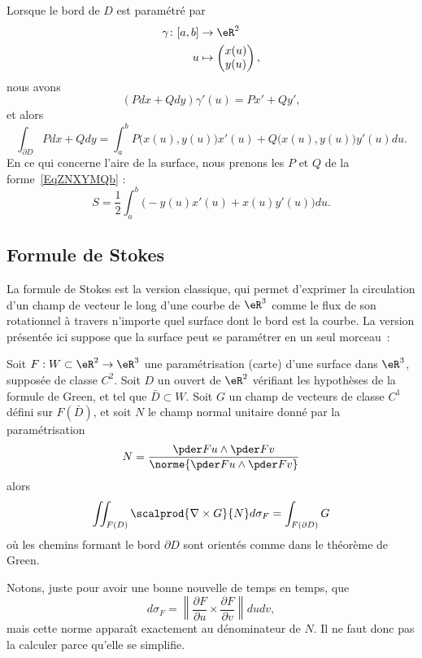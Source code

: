 Lorsque le bord de \( D\) est paramétré par
\begin{equation}
    \begin{aligned}
        \gamma\colon \mathopen[ a , b \mathclose]&\to \eR^2 \\
        u&\mapsto \begin{pmatrix}
            x(u)    \\
            y(u)
        \end{pmatrix},
    \end{aligned}
\end{equation}
nous avons
\begin{equation}
    (Pdx+Qdy)\gamma'(u)=Px'+Qy',
\end{equation}
et alors
\begin{equation}
    \int_{\partial D}Pdx+Qdy=\int_a^b P\big( x(u),y(u) \big)x'(u)+Q\big( x(u),y(u) \big)y'(u)du.
\end{equation}
En ce qui concerne l'aire de la surface, nous prenons les \( P\) et \( Q\) de la forme~\ref{EqZNXYMQb} :
\begin{equation}    \label{EqAJGrtOk}
    S=\frac{ 1 }{2}\int_a^b\Big( -y(u)x'(u)+x(u)y'(u) \Big)du.
\end{equation}

\subsection{Formule de Stokes}
\label{secstokesusuel}

La formule de Stokes est la version classique, qui permet d'exprimer la circulation d'un champ de vecteur le long d'une courbe de $\eR^3$ comme le flux de son rotationnel à travers n'importe quel surface dont le bord est la courbe. La version présentée ici suppose que la surface peut se paramétrer en un seul morceau~:
\begin{theorem}
  Soit $F : W\subset \eR^2 \to \eR^3$ une paramétrisation (carte) d'une surface dans $\eR^3$, supposée de classe $C^2$. Soit $D$ un ouvert de $\eR^2$ vérifiant les hypothèses de la formule de Green, et tel que $\bar D \subset W$. Soit $G$ un champ de vecteurs de classe $C^1$ défini sur $F(\bar D)$, et soit $N$ le champ normal unitaire donné par la paramétrisation
  \begin{equation}
	N = \frac{\pder F u \wedge \pder F v}{\norme{\pder F u \wedge \pder F v}}
\end{equation}
  alors
  \begin{equation}\label{EqStokesTho}
    \iint_{F(D)} \scalprod{\nabla\times G}{N} d\sigma_F = \int_{F(\partial D)} G
  \end{equation}
  où les chemins formant le bord $\partial D$ sont orientés comme dans le théorème de Green.
\end{theorem}
Notons, juste pour avoir une bonne nouvelle de temps en temps, que
\begin{equation}
	d\sigma_F=\left\| \frac{ \partial F }{ \partial u }\times\frac{ \partial F }{ \partial v }  \right\|dudv,
\end{equation}
mais cette norme apparaît exactement au dénominateur de $N$. Il ne faut donc pas la calculer parce qu'elle se simplifie.

